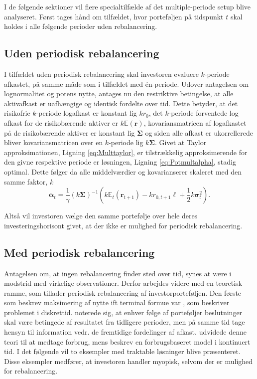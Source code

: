 \documentclass[
  a4paper,
  oneside]{memoir}
\begin{document}
I de følgende sektioner vil flere specialtilfælde af det multiple-periode setup blive analyseret. Først tages hånd om tilfældet, hvor porteføljen på tidspunkt \(t\) skal holdes i alle følgende perioder uden rebalancering.

\hypertarget{uden-periodisk-rebalancering}{%
\subsection{Uden periodisk rebalancering}\label{uden-periodisk-rebalancering}}

I tilfældet uden periodisk rebalancering skal investoren evaluere \(k\)-periode afkastet, på samme måde som i tilfældet med én-periode. Udover antagelsen om lognormalitet og potens nytte, antages nu den restriktive betingelse, at alle aktivafkast er uafhængige og identisk fordelte over tid. Dette betyder, at det risikofrie \(k\)-periode logafkast er konstant lig \(kr_{0}\), det \(k\)-periode forventede log afkast for de risikobærende aktiver er \(k\mathbb{E}(\bm{r})\), kovariansmatricen af logafkastet på de risikobærende aktiver er konstant lig \(\bm{\Sigma}\) og siden alle afkast er ukorrellerede bliver kovariansmatricen over en \(k\)-periode lig \(k\bm{\Sigma}\). Givet at Taylor approksimationen, Ligning \eqref{eq:Multtaylor}, er tilstrækkelig approksimerende for den givne respektive periode er løsningen, Ligning \eqref{eq:Potmultalpha}, stadig optimal. Dette følger da alle middelværdier og kovarianserer skaleret med den samme faktor, \(k\)
\begin{equation}
\bm{\alpha}_t=\frac{1}{\gamma}(k\bm{\Sigma})^{-1}\left(k\mathbb{E}_t(\bm{r}_{t+1})-kr_{0,t+1}\bm{\ell}+\frac{1}{2}k\bm{\sigma}_t^2\right). \label{eq:Potmultalphak}
\end{equation}

Altså vil investoren vælge den samme portefølje over hele deres investeringshorisont givet, at der ikke er mulighed for periodisk rebalancering.

\hypertarget{med-periodisk-rebalancering}{%
\subsection{Med periodisk rebalancering}\label{med-periodisk-rebalancering}}

Antagelsen om, at ingen rebalancering finder sted over tid, synes at være i modstrid med virkelige observationer. Derfor arbejdes videre med en teoretisk ramme, som tillader periodisk rebalancering af investorporteføljen. Den første som beskrev maksimering af nytte ift terminal formue var \citep{Mossin1968}, som beskriver problemet i diskrettid. \citep{Mossin1968} noterede sig, at enhver følge af porteføljer beslutninger skal være betingede af resultatet fra tidligere perioder, men på samme tid tage hensyn til information vedr. de fremtidige fordelinger af afkast. \citep{Samuelson1969} udvidede denne teori til at medtage forbrug, mens \citep{Merton1969, Merton1971} beskrev en forbrugsbaseret model i kontinuert tid. I det følgende vil to eksempler med traktable løsninger blive præsenteret. Disse eksempler medfører, at investoren handler myopisk, selvom der er mulighed for rebalancering.
\end{document}
